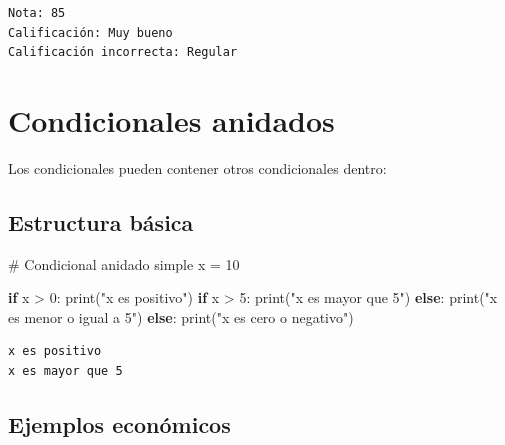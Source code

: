 \documentclass[
  doc,
  floatsintext,
  longtable,
  a4paper,
  nolmodern,
  notxfonts,
  notimes,
  12pt,
  colorlinks=true,linkcolor=blue,citecolor=blue,urlcolor=blue]{apa7}
\newenvironment{Shaded}{\begin{snugshade}}{\end{snugshade}}
\newcommand{\BuiltInTok}[1]{\textcolor[rgb]{0.00,0.23,0.31}{#1}}
\newcommand{\CommentTok}[1]{\textcolor[rgb]{0.37,0.37,0.37}{#1}}
\newcommand{\ControlFlowTok}[1]{\textcolor[rgb]{0.00,0.23,0.31}{\textbf{#1}}}
\newcommand{\DecValTok}[1]{\textcolor[rgb]{0.68,0.00,0.00}{#1}}
\newcommand{\NormalTok}[1]{\textcolor[rgb]{0.00,0.23,0.31}{#1}}
\newcommand{\OperatorTok}[1]{\textcolor[rgb]{0.37,0.37,0.37}{#1}}
\newcommand{\StringTok}[1]{\textcolor[rgb]{0.13,0.47,0.30}{#1}}
\begin{document}
\begin{verbatim}
Nota: 85
Calificación: Muy bueno
Calificación incorrecta: Regular
\end{verbatim}

\section{Condicionales anidados}\label{condicionales-anidados}

Los condicionales pueden contener otros condicionales dentro:

\subsection{Estructura básica}\label{estructura-buxe1sica}

\begin{Shaded}
\begin{Highlighting}[]
\CommentTok{\# Condicional anidado simple}
\NormalTok{x }\OperatorTok{=} \DecValTok{10}

\ControlFlowTok{if}\NormalTok{ x }\OperatorTok{\textgreater{}} \DecValTok{0}\NormalTok{:}
    \BuiltInTok{print}\NormalTok{(}\StringTok{"x es positivo"}\NormalTok{)}
    \ControlFlowTok{if}\NormalTok{ x }\OperatorTok{\textgreater{}} \DecValTok{5}\NormalTok{:}
        \BuiltInTok{print}\NormalTok{(}\StringTok{"x es mayor que 5"}\NormalTok{)}
    \ControlFlowTok{else}\NormalTok{:}
        \BuiltInTok{print}\NormalTok{(}\StringTok{"x es menor o igual a 5"}\NormalTok{)}
\ControlFlowTok{else}\NormalTok{:}
    \BuiltInTok{print}\NormalTok{(}\StringTok{"x es cero o negativo"}\NormalTok{)}
\end{Highlighting}
\end{Shaded}

\begin{verbatim}
x es positivo
x es mayor que 5
\end{verbatim}

\subsection{Ejemplos económicos}\label{ejemplos-econuxf3micos-3}
\end{document}
